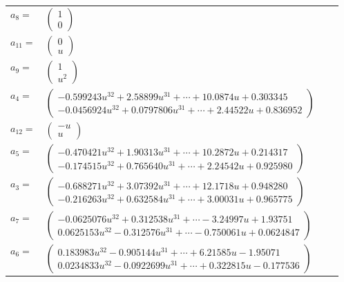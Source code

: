 \documentclass[1p]{elsarticle_modified}
\theoremstyle{definition}
\begin{document}
\begin{tabular}{m{7pt} m{180pt} m{7pt} m{180pt} }
\flushright $a_{8}=$&$\begin{pmatrix}1\\0\end{pmatrix}$ \\
\flushright $a_{11}=$&$\begin{pmatrix}0\\u\end{pmatrix}$ \\
\flushright $a_{9}=$&$\begin{pmatrix}1\\u^2\end{pmatrix}$ \\
\flushright $a_{4}=$&$\begin{pmatrix}-0.599243 u^{32}+2.58899 u^{31}+\cdots+10.0874 u+0.303345\\-0.0456924 u^{32}+0.0797806 u^{31}+\cdots+2.44522 u+0.836952\end{pmatrix}$ \\
\flushright $a_{12}=$&$\begin{pmatrix}- u\\u\end{pmatrix}$ \\
\flushright $a_{5}=$&$\begin{pmatrix}-0.470421 u^{32}+1.90313 u^{31}+\cdots+10.2872 u+0.214317\\-0.174515 u^{32}+0.765640 u^{31}+\cdots+2.24542 u+0.925980\end{pmatrix}$ \\
\flushright $a_{3}=$&$\begin{pmatrix}-0.688271 u^{32}+3.07392 u^{31}+\cdots+12.1718 u+0.948280\\-0.216263 u^{32}+0.632584 u^{31}+\cdots+3.00031 u+0.965775\end{pmatrix}$ \\
\flushright $a_{7}=$&$\begin{pmatrix}-0.0625076 u^{32}+0.312538 u^{31}+\cdots-3.24997 u+1.93751\\0.0625153 u^{32}-0.312576 u^{31}+\cdots-0.750061 u+0.0624847\end{pmatrix}$ \\
\flushright $a_{6}=$&$\begin{pmatrix}0.183983 u^{32}-0.905144 u^{31}+\cdots+6.21585 u-1.95071\\0.0234833 u^{32}-0.0922699 u^{31}+\cdots+0.322815 u-0.177536\end{pmatrix}$ \\

\end{tabular}
\end{document}

